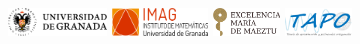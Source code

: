 \documentclass[portrait,final,a0paper,fontscale=0.38]{baposter}
\begin{document}
\begin{poster}
{%
\centerline{
\includegraphics[height=0.73cm]{ugrH} \quad
\includegraphics[height=0.73cm]{IMAG} \quad
\includegraphics[height=0.73cm]{maeztu} \quad
\includegraphics[height=0.73cm]{tapo.png}
}

}
\end{poster}
\end{document}
